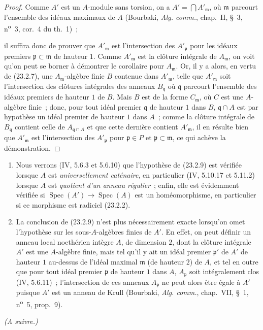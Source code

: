 \begin{proof}
Comme $A'$ est un $A$-module sans torsion, on a
$A'=\bigcap A'_{\mathfrak m}$, où $\mathfrak m$ parcourt l'ensemble des idéaux
maximaux de $A$ (Bourbaki, \emph{Alg. comm.}, chap.~II, §~3,
n\textsuperscript{o}~3, cor.~4 du th.~1)~;


il suffira donc de prouver que $A'_{\mathfrak m}$ est l'intersection des
$A'_{\mathfrak p}$ pour les idéaux premiers $\mathfrak p\subset\mathfrak m$
de hauteur $1$. Comme $A'_{\mathfrak m}$ est la clôture intégrale de
$A_{\mathfrak m}$, on voit qu'on peut se borner à démontrer le corollaire pour
$A_{\mathfrak m}$. Or, il y a alors, en vertu de (23.2.7), une
$A_{\mathfrak m}$-algèbre finie $B$ contenue dans $A'_{\mathfrak m}$, telle
que $A'_{\mathfrak m}$ soit l'intersection des clôtures intégrales des anneaux
$B_{\mathfrak q}$ où $\mathfrak q$ parcourt l'ensemble des idéaux premiers de
hauteur $1$ de $B$. Mais $B$ est de la forme $C_{\mathfrak m}$, où $C$ est
une $A$-algèbre finie~; donc, pour tout idéal premier $\mathfrak q$ de hauteur
$1$ dans $B$, $\mathfrak q\cap A$ est par hypothèse un idéal premier de
hauteur $1$ dans $A$~; comme la clôture intégrale de $B_{\mathfrak q}$
contient celle de $A_{\mathfrak q\cap A}$ et que cette dernière contient
$A'_{\mathfrak m}$, il en résulte bien que $A'_{\mathfrak m}$ est
l'intersection des $A'_{\mathfrak p}$ pour $\mathfrak p\in P$ et
$\mathfrak p\subset\mathfrak m$, ce qui achève la démonstration.
\end{proof}

\begin{remarks}[23.2.10]
\label{0.23.2.10-fr}
\begin{enumerate}
  \item[(i)] Nous verrons (IV, 5.6.3 et 5.6.10) que l'hypothèse de (23.2.9)
  est vérifiée lorsque $A$ est \emph{universellement caténaire}, en particulier
  (IV, 5.10.17 et 5.11.2) lorsque $A$ est \emph{quotient d'un anneau
  régulier}~; enfin, elle est évidemment vérifiée si
  $\operatorname{Spec}(A')\to\operatorname{Spec}(A)$ est un homéomorphisme,
  en particulier si ce morphisme est radiciel (23.2.2).

  \item[(ii)] La conclusion de (23.2.9) n'est plus nécessairement exacte
  lorsqu'on omet l'hypothèse sur les sous-$A$-algèbres finies de $A'$. En
  effet, on peut définir un anneau local noethérien intègre $A$, de dimension
  $2$, dont la clôture intégrale $A'$ est une $A$-algèbre finie, mais tel qu'il
  y ait un idéal premier $\mathfrak p'$ de $A'$ de hauteur $1$ au-dessus de
  l'idéal maximal $\mathfrak m$ (de hauteur $2$) de $A$, et tel en outre que
  pour tout idéal premier $\mathfrak p$ de hauteur $1$ dans $A$,
  $A_{\mathfrak p}$ soit intégralement clos (IV, 5.6.11)~; l'intersection de
  ces anneaux $A_{\mathfrak p}$ ne peut alors être égale à $A'$ puisque $A'$
  est un anneau de Krull (Bourbaki, \emph{Alg. comm.}, chap.~VII, §~1,
  n\textsuperscript{o}~5, prop.~9).
\end{enumerate}
\end{remarks}

\begin{flushright}
\emph{(A suivre.)}
\end{flushright}
